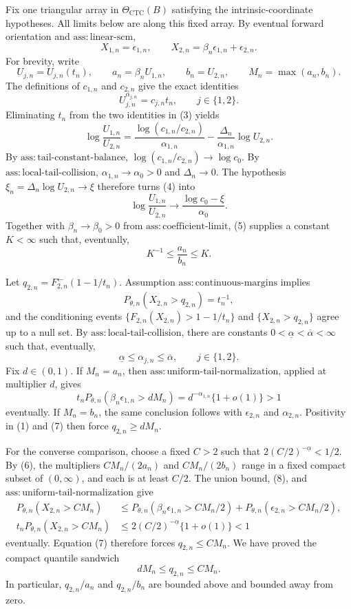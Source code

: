 Fix one triangular array in \(\Theta_{\mathrm{CTC}}(B)\) satisfying the intrinsic-coordinate hypotheses. All limits below are along this fixed array. By eventual forward orientation and \(\mathrm{ass{:}linear\text{-}scm}\),
\[
X_{1,n}=\epsilon_{1,n},
\qquad
X_{2,n}=\beta_n\epsilon_{1,n}+\epsilon_{2,n}.
\tag{1}
\]
For brevity, write
\[
U_{j,n}=U_{j,n}(t_n),
\qquad
a_n=\beta_nU_{1,n},
\qquad
b_n=U_{2,n},
\qquad
M_n=\max(a_n,b_n).
\tag{2}
\]
The definitions of \(c_{1,n}\) and \(c_{2,n}\) give the exact identities
\[
U_{j,n}^{\alpha_{j,n}}=c_{j,n}t_n,
\qquad j\in\{1,2\}.
\tag{3}
\]
Eliminating \(t_n\) from the two identities in (3) yields
\[
\log\frac{U_{1,n}}{U_{2,n}}
=\frac{\log(c_{1,n}/c_{2,n})}{\alpha_{1,n}}
-\frac{\Delta_n}{\alpha_{1,n}}\log U_{2,n}.
\tag{4}
\]
By \(\mathrm{ass{:}tail\text{-}constant\text{-}balance}\), \(\log(c_{1,n}/c_{2,n})\to\log c_0\). By \(\mathrm{ass{:}local\text{-}tail\text{-}collision}\), \(\alpha_{1,n}\to\alpha_0>0\) and \(\Delta_n\to0\). The hypothesis \(\xi_n=\Delta_n\log U_{2,n}\to\xi\) therefore turns (4) into
\[
\log\frac{U_{1,n}}{U_{2,n}}
\longrightarrow \frac{\log c_0-\xi}{\alpha_0}.
\tag{5}
\]
Together with \(\beta_n\to\beta_0>0\) from \(\mathrm{ass{:}coefficient\text{-}limit}\), (5) supplies a constant \(K<\infty\) such that, eventually,
\[
K^{-1}\leq\frac{a_n}{b_n}\leq K.
\tag{6}
\]

Let \(q_{2,n}=F_{2,n}^{\leftarrow}(1-1/t_n)\). Assumption \(\mathrm{ass{:}continuous\text{-}margins}\) implies
\[
P_{\theta,n}(X_{2,n}>q_{2,n})=t_n^{-1},
\tag{7}
\]
and the conditioning events \(\{F_{2,n}(X_{2,n})>1-1/t_n\}\) and \(\{X_{2,n}>q_{2,n}\}\) agree up to a null set. By \(\mathrm{ass{:}local\text{-}tail\text{-}collision}\), there are constants \(0<\underline\alpha<\overline\alpha<\infty\) such that, eventually,
\[
\underline\alpha\leq\alpha_{j,n}\leq\overline\alpha,
\qquad j\in\{1,2\}.
\tag{8}
\]
Fix \(d\in(0,1)\). If \(M_n=a_n\), then \(\mathrm{ass{:}uniform\text{-}tail\text{-}normalization}\), applied at multiplier \(d\), gives
\[
t_nP_{\theta,n}(\beta_n\epsilon_{1,n}>dM_n)
=d^{-\alpha_{1,n}}\{1+o(1)\}>1
\tag{9}
\]
eventually. If \(M_n=b_n\), the same conclusion follows with \(\epsilon_{2,n}\) and \(\alpha_{2,n}\). Positivity in (1) and (7) then force \(q_{2,n}\geq dM_n\).

For the converse comparison, choose a fixed \(C>2\) such that \(2(C/2)^{-\underline\alpha}<1/2\). By (6), the multipliers \(CM_n/(2a_n)\) and \(CM_n/(2b_n)\) range in a fixed compact subset of \((0,\infty)\), and each is at least \(C/2\). The union bound, (8), and \(\mathrm{ass{:}uniform\text{-}tail\text{-}normalization}\) give
\[
\begin{aligned}
P_{\theta,n}(X_{2,n}>CM_n)
&\leq P_{\theta,n}(\beta_n\epsilon_{1,n}>CM_n/2)
+P_{\theta,n}(\epsilon_{2,n}>CM_n/2),\\
t_nP_{\theta,n}(X_{2,n}>CM_n)
&\leq 2(C/2)^{-\underline\alpha}\{1+o(1)\}<1
\end{aligned}
\tag{10}
\]
eventually. Equation (7) therefore forces \(q_{2,n}\leq CM_n\). We have proved the compact quantile sandwich
\[
dM_n\leq q_{2,n}\leq CM_n.
\tag{11}
\]
In particular, \(q_{2,n}/a_n\) and \(q_{2,n}/b_n\) are bounded above and bounded away from zero.

